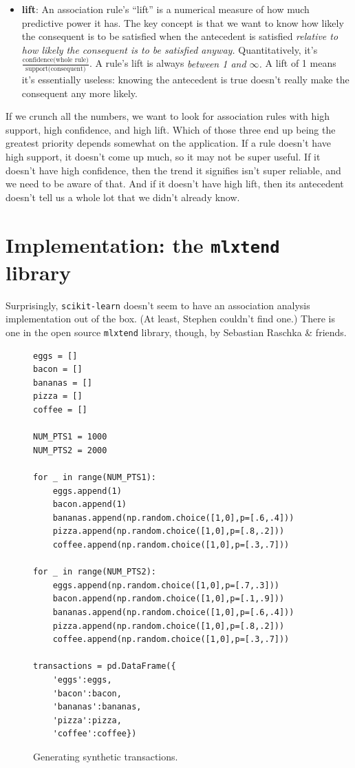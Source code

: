 \begin{itemize}
\item \textbf{lift}: An association rule's ``lift'' is a numerical measure of
how much predictive power it has. The key concept is that we want to know how
likely the consequent is to be satisfied when the antecedent is satisfied 
\textit{relative to how likely the consequent is to be satisfied anyway.}
Quantitatively, it's $\frac{\textrm{confidence(whole
rule)}}{\textrm{support(consequent)}}$. A rule's lift is always \textit{between 1 and
$\infty$.} A lift of 1 means it's essentially useless: knowing the antecedent
is true doesn't really make the consequent any more likely.
\end{itemize}

If we crunch all the numbers, we want to look for association rules with high
support, high confidence, and high lift. Which of those three end up being
the greatest priority depends somewhat on the application. If a rule doesn't
have high support, it doesn't come up much, so it may not be super useful. If
it doesn't have high confidence, then the trend it signifies isn't super
reliable, and we need to be aware of that. And if it doesn't have high lift,
then its antecedent doesn't tell us a whole lot that we didn't already know.

\section{Implementation: the \texttt{mlxtend} library}

Surprisingly, \texttt{scikit-learn} doesn't seem to have an association
analysis implementation out of the box. (At least, Stephen couldn't find one.)
There is one in the open source \texttt{mlxtend} library, though, by Sebastian
Raschka \& friends.

\begin{figure}
\begin{Verbatim}[fontsize=\small,samepage=true,frame=single]
eggs = []
bacon = []
bananas = []
pizza = []
coffee = []

NUM_PTS1 = 1000
NUM_PTS2 = 2000

for _ in range(NUM_PTS1):
    eggs.append(1)
    bacon.append(1)
    bananas.append(np.random.choice([1,0],p=[.6,.4]))
    pizza.append(np.random.choice([1,0],p=[.8,.2]))
    coffee.append(np.random.choice([1,0],p=[.3,.7]))

for _ in range(NUM_PTS2):
    eggs.append(np.random.choice([1,0],p=[.7,.3]))
    bacon.append(np.random.choice([1,0],p=[.1,.9]))
    bananas.append(np.random.choice([1,0],p=[.6,.4]))
    pizza.append(np.random.choice([1,0],p=[.8,.2]))
    coffee.append(np.random.choice([1,0],p=[.3,.7]))

transactions = pd.DataFrame({
    'eggs':eggs,
    'bacon':bacon,
    'bananas':bananas,
    'pizza':pizza,
    'coffee':coffee})
\end{Verbatim}
\caption{Generating synthetic transactions.}
\label{fig:genBaskets}
\end{figure}

